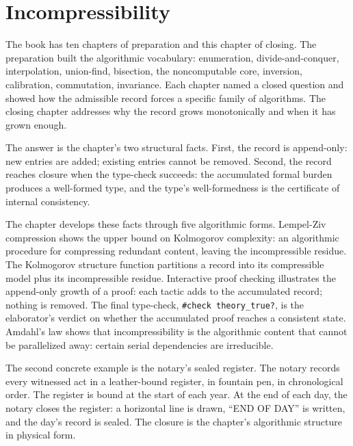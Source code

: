 \chapter{Incompressibility}
\label{chap:incompressibility}


\begin{chapteressay}

The book has ten chapters of preparation and this chapter of closing.
The preparation built the algorithmic vocabulary: enumeration,
divide-and-conquer, interpolation, union-find, bisection, the
noncomputable core, inversion, calibration, commutation, invariance.
Each chapter named a closed question and showed how the admissible
record forces a specific family of algorithms. The closing chapter
addresses why the record grows monotonically and when it has grown
enough.

The answer is the chapter's two structural facts. First, the record
is append-only: new entries are added; existing entries cannot be
removed. Second, the record reaches closure when the type-check
succeeds: the accumulated formal burden produces a well-formed
type, and the type's well-formedness is the certificate of internal
consistency.

The chapter develops these facts through five algorithmic forms.
Lempel-Ziv compression shows the upper bound on Kolmogorov
complexity: an algorithmic procedure for compressing redundant
content, leaving the incompressible residue. The Kolmogorov
structure function partitions a record into its compressible
model plus its incompressible residue. Interactive proof checking
illustrates the append-only growth of a proof: each tactic adds
to the accumulated record; nothing is removed. The final
type-check, \texttt{\#check theory\_true?}, is the elaborator's
verdict on whether the accumulated proof reaches a consistent
state. Amdahl's law shows that incompressibility is the
algorithmic content that cannot be parallelized away: certain
serial dependencies are irreducible.

The second concrete example is the notary's sealed register. The
notary records every witnessed act in a leather-bound register,
in fountain pen, in chronological order. The register is bound at
the start of each year. At the end of each day, the notary closes
the register: a horizontal line is drawn, ``END OF DAY'' is
written, and the day's record is sealed. The closure is the
chapter's algorithmic structure in physical form.


\end{chapteressay}
